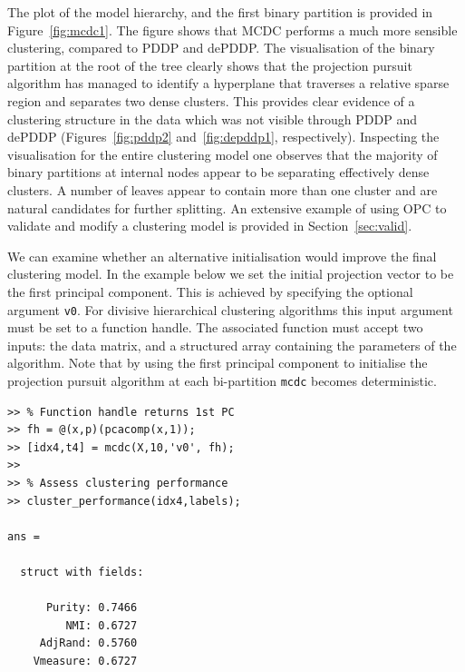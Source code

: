 \documentclass{book}
\begin{document}
The plot of the model hierarchy, and the first binary partition is provided in
Figure~\ref{fig:mcdc1}.
%
The figure shows that MCDC performs a much more sensible clustering, compared
to PDDP and dePDDP. The visualisation of the binary partition at the root of
the tree clearly shows that the projection pursuit algorithm has managed to
identify a hyperplane that traverses a relative sparse region and separates two
dense clusters. This provides clear evidence of a clustering structure in the
data which was not visible through PDDP and dePDDP (Figures~\ref{fig:pddp2}
and~\ref{fig:depddp1}, respectively).
%
Inspecting the visualisation for the entire clustering model one observes that
the majority of binary partitions at internal nodes appear to be separating
effectively dense clusters. 
%
%
A number of leaves appear to contain more than one cluster and are natural
candidates for further splitting. 
%
An extensive example of using OPC to validate and modify a clustering model is
provided in Section~\ref{sec:valid}.



We can examine whether an alternative initialisation would improve the final
clustering model. In the example below we set the initial projection vector to
be the first principal component. This is achieved by specifying the optional argument
{\tt v0}. For divisive hierarchical clustering algorithms this input argument
must be set to a function handle.
The associated function must accept two inputs:
the data matrix, and a structured array containing the parameters of the algorithm.
%
Note that by using the first principal component to initialise the projection
pursuit algorithm at each bi-partition {\tt mcdc} becomes deterministic. 

\begin{verbatim}
>> % Function handle returns 1st PC
>> fh = @(x,p)(pcacomp(x,1));
>> [idx4,t4] = mcdc(X,10,'v0', fh);
>> 
>> % Assess clustering performance
>> cluster_performance(idx4,labels);

ans = 

  struct with fields:

      Purity: 0.7466
         NMI: 0.6727
     AdjRand: 0.5760
    Vmeasure: 0.6727

\end{verbatim}
\end{document}
